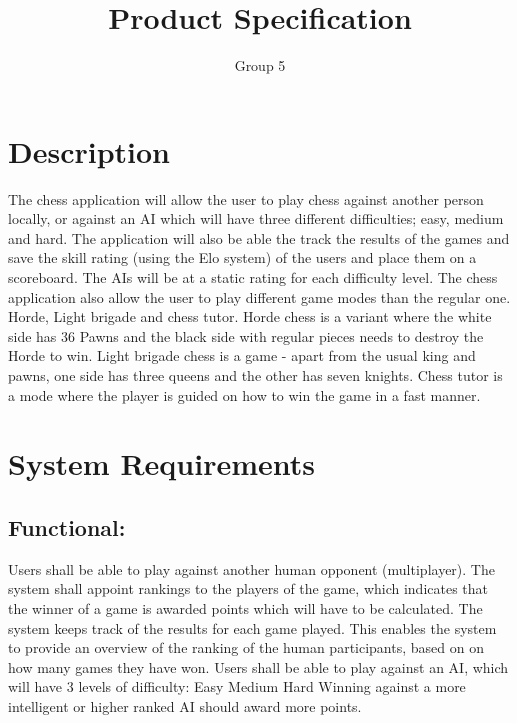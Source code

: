 \documentclass{article}
\title{Product Specification}
\author{Group 5}
\date{}
\begin{document}
    \maketitle

    \section{Description}
    The chess application will allow the user to play chess against another person locally, or against an AI which will have three different difficulties; easy, medium and hard. The application will also be able the track the results of the games and save the skill rating (using the Elo system) of the users and place them on a scoreboard. The AIs will be at a static rating for each difficulty level. The chess application also allow the user to play different game modes than the regular one. Horde, Light brigade and chess tutor. Horde chess is a variant where the white side has 36 Pawns and the black side with regular pieces needs to destroy the Horde to win. Light brigade chess is a game - apart from the usual king and pawns, one side has three queens and the other has seven knights. Chess tutor is a mode where the player is guided on how to win the game in a fast manner.

    \section{System Requirements}
    \subsection{Functional:}
    \begin{outline}
          \1 Users shall be able to play against another human opponent (multiplayer).
          \1 The system shall appoint rankings to the players of the game, which indicates
             that the winner of a game is awarded points which will have to be calculated.
          \1 The system keeps track of the results for each game played.
          \2 This enables the system to provide an overview of the ranking of the human participants,
             based on on how many games they have won.
          \1 Users shall be able to play against an AI, which will have 3 levels of difficulty:
          \2 Easy
          \2 Medium
          \2 Hard
          \1 Winning against a more intelligent or higher ranked AI should award more points.
     \end{outline}
\end{document}
